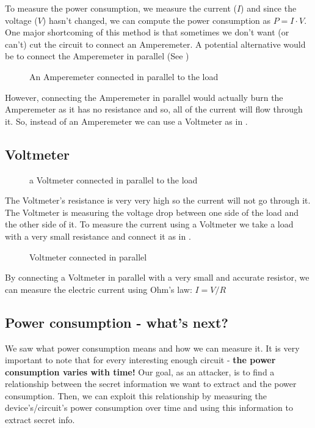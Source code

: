 To measure the power consumption, we measure the current ($I$) and since the voltage ($V$) 
hasn't changed, we can compute the power consumption as $P=I \cdot V$.
One major shortcoming of this method is that sometimes we don't want (or can't) 
cut the circuit to connect an Amperemeter. A potential alternative would be to connect the Amperemeter in parallel (See )

\begin{figure}[!ht]
    \centering
    
    \caption{An Amperemeter connected in parallel to the load} \label{fig:circuit6}
\end{figure}

However, connecting the Amperemeter in parallel would actually burn the Amperemeter as it has no resistance and so, all of the current will flow through it. So, instead of an
Amperemeter we can use a Voltmeter as in  .

\subsection{Voltmeter}

\begin{figure}[!ht]
    \centering
    
    \caption{a Voltmeter connected in parallel to the load} \label{fig:circuit7}
\end{figure}

The Voltmeter's resistance is very very high so the current will not go through
it. The Voltmeter is measuring the voltage drop between one side of the load and
the other side of it. To measure the current using a Voltmeter we
take a load with a very small resistance and connect it as in .

\begin{figure}[!ht]
    \centering
    
    \caption{Voltmeter connected in parallel} \label{fig:circuit8}
\end{figure}

By connecting a Voltmeter in parallel with a very small and accurate resistor, we can measure the electric current
using Ohm's law: $I=V/R$
 
\subsection{Power consumption - what's next?}
We saw what power consumption means and how we can measure it. It is very important to
note that for every interesting enough circuit - \textbf{the power consumption varies with time!} 
Our goal, as an attacker, is to find a relationship between the secret information we want to extract and the
power consumption. Then, we can exploit this relationship by measuring the device's/circuit's power consumption 
over time and using this information to extract secret info.

